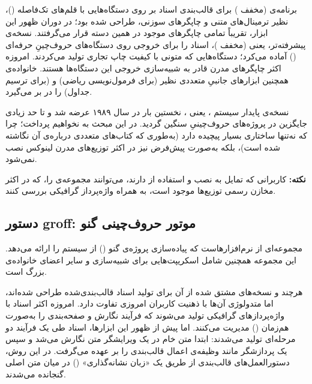برنامه‌ی  (مخفف ) برای قالب‌بندی اسناد بر روی دستگاه‌هایی با قلم‌های تک‌فاصله ()، نظیر ترمینال‌های متنی و چاپگرهای سوزنی، طراحی شده بود؛ در دوران ظهور این ابزار، تقریباً تمامی چاپگرهای موجود در همین دسته قرار می‌گرفتند. نسخه‌ی پیشرفته‌تر، یعنی  (مخفف )، اسناد را برای خروجی روی دستگاه‌های حروف‌چینِ حرفه‌ای () آماده می‌کرد؛ دستگاه‌هایی که متونی با کیفیت چاپ تجاری تولید می‌کردند. امروزه اکثر چاپگرهای مدرن قادر به شبیه‌سازی خروجی این دستگاه‌ها هستند. خانواده‌ی  همچنین ابزارهای جانبیِ متعددی نظیر  (برای فرمول‌نویسی ریاضی) و  (برای ترسیم جداول) را در بر می‌گیرد.

نسخه‌ی پایدار سیستم ، یعنی ، نخستین بار در سال ۱۹۸۹ عرضه شد و تا حد زیادی جایگزین  در پروژه‌های حروف‌چینیِ سنگین گردید. در این مبحث به  نخواهیم پرداخت؛ چرا که نه‌تنها ساختاری بسیار پیچیده دارد (به‌طوری که کتاب‌های متعددی درباره‌ی آن نگاشته شده است)، بلکه به‌صورت پیش‌فرض نیز در اکثر توزیع‌های مدرن لینوکس نصب نمی‌شود.

\begin{note}
\textbf{نکته:} کاربرانی که تمایل به نصب و استفاده از  دارند، می‌توانند مجموعه‌ی  را، که در اکثر مخازن رسمی توزیع‌ها موجود است، به همراه واژه‌پرداز گرافیکی  بررسی کنند.
\end{note}

\subsection{دستور groff: موتور حروف‌چینی گنو}

 مجموعه‌ای از نرم‌افزارهاست که پیاده‌سازی پروژه‌ی گنو () از سیستم  را ارائه می‌دهد. این مجموعه همچنین شامل اسکریپت‌هایی برای شبیه‌سازی  و سایر اعضای خانواده‌ی بزرگ  است.

هرچند  و نسخه‌های مشتق شده از آن برای تولید اسناد قالب‌بندی‌شده طراحی شده‌اند، اما متدولوژی آن‌ها با ذهنیت کاربران امروزی تفاوت دارد. امروزه اکثر اسناد با واژه‌پردازهای گرافیکی تولید می‌شوند که فرآیند نگارش و صفحه‌بندی را به‌صورت هم‌زمان () مدیریت می‌کنند. اما پیش از ظهور این ابزارها، اسناد طی یک فرآیند دو مرحله‌ای تولید می‌شدند: ابتدا متن خام در یک ویرایشگر متن نگارش می‌شد و سپس یک پردازشگر مانند  وظیفه‌ی اعمال قالب‌بندی را بر عهده می‌گرفت. در این روش، دستورالعمل‌های قالب‌بندی از طریق یک «زبان نشانه‌گذاری» () در میان متن اصلی گنجانده می‌شدند.

